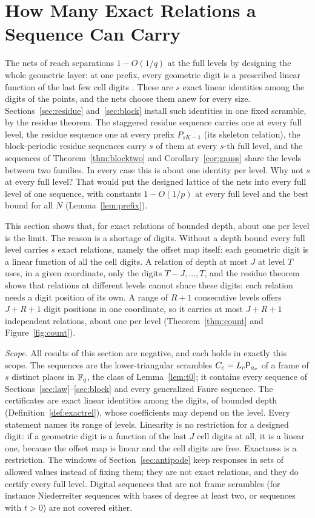 %
%
%
%
%
%
%
%
\section{How Many Exact Relations a Sequence Can Carry}\label{sec:count}
The nets of \cite{Gru26geo} reach separations $1-O(1/q)$ at the full levels by designing the whole geometric layer: at one prefix, every geometric digit is a prescribed linear function of the last few cell digits%
. These are $s$ exact linear identities among the digits of the points, and the nets choose them anew for every size. Sections~\ref{sec:residue} and~\ref{sec:block} install such identities in one fixed scramble, by the residue theorem. The staggered residue sequence carries one at every full level, the residue sequence one at every prefix $P_{sK-1}$ (its skeleton relation), the block-periodic residue sequences carry $s$ of them at every $s$-th full level, and the sequences of Theorem~\ref{thm:blocktwo} and Corollary~\ref{cor:gauss} share the levels between two families. In every case this is about one identity per level. Why not $s$ at every full level? That would put the designed lattice of the nets into every full level of one sequence, with constants $1-O(1/p)$ at every full level and the best bound for all $N$ (Lemma~\ref{lem:prefix}).

This section shows that, for exact relations of bounded depth, about one per level is the limit. The reason is a shortage of digits. Without a depth bound every full level carries $s$ exact relations, namely the offset map itself: each geometric digit is a linear function of all the cell digits. A relation of depth at most $J$ at level $T$ uses, in a given coordinate, only the digits $T-J,\dots,T$, and the residue theorem shows that relations at different levels cannot share these digits: each relation needs a digit position of its own. A range of $R+1$ consecutive levels offers $J+R+1$ digit positions in one coordinate, so it carries at most $J+R+1$ independent relations, about one per level (Theorem~\ref{thm:count} and Figure~\ref{fig:count}).

\emph{Scope.} All results of this section are negative, and each holds in exactly this scope. The sequences are the lower-triangular scrambles $C_c=L_c\mathsf{P}_{a_c}$ of a frame of $s$ distinct places in $\mathbb{F}_q$, the class of Lemma~\ref{lem:t0}; it contains every sequence of Sections~\ref{sec:law}--\ref{sec:block} and every generalized Faure sequence. The certificates are exact linear identities among the digits, of bounded depth (Definition~\ref{def:exactrel}), whose coefficients may depend on the level. Every statement names its range of levels. Linearity is no restriction for a designed digit: if a geometric digit is a function of the last $J$ cell digits at all, it is a linear one, because the offset map is linear and the cell digits are free. Exactness is a restriction. The windows of Section~\ref{sec:antipode} keep responses in sets of allowed values instead of fixing them; they are not exact relations, and they do certify every full level. Digital sequences that are not frame scrambles (for instance Niederreiter sequences with bases of degree at least two, or sequences with $t>0$) are not covered either.

